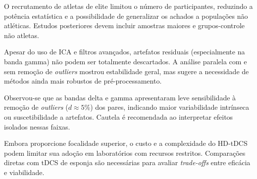 O recrutamento de atletas de elite limitou o número de participantes, reduzindo a potência estatística e a possibilidade de generalizar os achados a populações não atléticas. Estudos posteriores devem incluir amostras maiores e grupos-controle não atletas.

Apesar do uso de ICA e filtros avançados, artefatos residuais (especialmente na banda gamma) não podem ser totalmente descartados. A análise paralela com e sem remoção de \textit{outliers} mostrou estabilidade geral, mas sugere a necessidade de métodos ainda mais robustos de pré-processamento.

Observou-se que as bandas delta e gamma apresentaram leve sensibilidade à remoção de \textit{outliers} (\(d\approx5\)\%) dos pares, indicando maior variabilidade intrínseca ou suscetibilidade a artefatos. Cautela é recomendada ao interpretar efeitos isolados nessas faixas.

Embora proporcione focalidade superior, o custo e a complexidade do HD-tDCS podem limitar sua adoção em laboratórios com recursos restritos. Comparações diretas com tDCS de esponja são necessárias para avaliar \textit{trade-offs} entre eficácia e viabilidade.